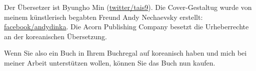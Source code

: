 Der Übersetzer ist Byungho Min (\href{http://go.yurichev.com/17344}{twitter/tais9}).
Die Cover-Gestaltug wurde von meinem künstlerisch begabten Freund Andy Nechaevsky erstellt:
\href{http://go.yurichev.com/17023}{facebook/andydinka}.
Die Acorn Publishing Company besetzt die Urheberrechte an der koreanischen Übersetzung.

Wenn Sie also ein  Buch in Ihrem Buchregal auf koreanisch haben und 
mich bei meiner Arbeit unterstützen wollen, können Sie das Buch nun kaufen.
